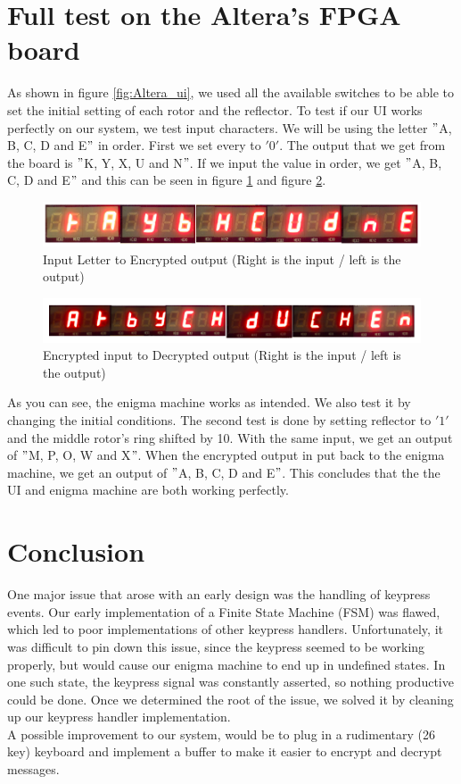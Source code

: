 \documentclass[10pt]{article}
\begin{document}
\section{Full test on the Altera's FPGA board}
As shown in figure \ref{fig:Altera_ui}, we used all the available switches to be able to set the initial setting of each rotor and the reflector. To test if our UI works perfectly on our system, we test input characters. We will be using the letter $"$A, B, C, D and E$"$ in order. First we set every to $'0'$. The output that we get from the board is $"$K, Y, X, U and N$"$. If we input the value in order, we get $"$A, B, C, D and E$"$ and this can be seen in figure \ref{fig:letter_encrypt} and figure \ref{fig:encrypt_letter}.\\
\begin{figure}[!htb]
    \centering
    \includegraphics[width=1\textwidth]{./letter_encrypt.png}
    \caption{Input Letter to Encrypted output (Right is the input / left is the output)}
    \label{fig:letter_encrypt}
\end{figure}
\begin{figure}[!htb]
    \centering
    \includegraphics[width=1\textwidth]{./encrypt_letter.png}
    \caption{Encrypted input to Decrypted output (Right is the input / left is the output)}
    \label{fig:encrypt_letter}
\end{figure}
\newline

As you can see, the enigma machine works as intended. We also test it by changing the initial conditions. The second test is done by setting reflector to $'1'$ and the middle rotor's ring shifted by 10. With the same input, we get an output of $"$M, P, O, W and X$"$. When the encrypted output in put back to the enigma machine, we get an output of $"$A, B, C, D and E$"$. This concludes that the the UI and enigma machine are both working perfectly.

\section{Conclusion}
One major issue that arose with an early design was the handling of keypress events. Our early implementation of a Finite State Machine (FSM) was flawed, which led to poor implementations of other keypress handlers. Unfortunately, it was difficult to pin down this issue, since the keypress seemed to be working properly, but would cause our enigma machine to end up in undefined states. In one such state, the keypress signal was constantly asserted, so nothing productive could be done. Once we determined the root of the issue, we solved it by cleaning up our keypress handler implementation.\\

A possible improvement to our system, would be to plug in a rudimentary (26 key) keyboard and implement a buffer to make it easier to encrypt and decrypt messages.
\end{document}
